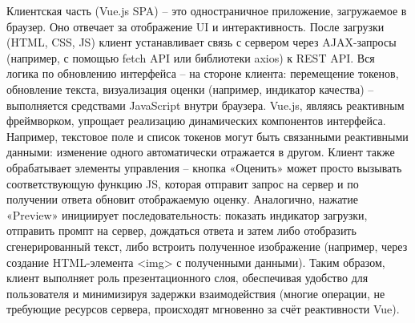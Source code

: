 Клиентская часть (Vue.js SPA) – это одностраничное приложение, загружаемое в браузер. Оно отвечает за отображение UI и интерактивность. После загрузки (HTML, CSS, JS) клиент устанавливает связь с сервером через AJAX-запросы (например, с помощью fetch API или библиотеки axios) к REST API. Вся логика по обновлению интерфейса – на стороне клиента: перемещение токенов, обновление текста, визуализация оценки (например, индикатор качества) – выполняется средствами JavaScript внутри браузера. Vue.js, являясь реактивным фреймворком, упрощает реализацию динамических компонентов интерфейса\cite{vuejs:wiki}. Например, текстовое поле и список токенов могут быть связанными реактивными данными: изменение одного автоматически отражается в другом. Клиент также обрабатывает элементы управления – кнопка «Оценить» может просто вызывать соответствующую функцию JS, которая отправит запрос на сервер и по получении ответа обновит отображаемую оценку. Аналогично, нажатие «Preview» инициирует последовательность: показать индикатор загрузки, отправить промпт на сервер, дождаться ответа и затем либо отобразить сгенерированный текст, либо встроить полученное изображение (например, через создание HTML-элемента <img> с полученными данными). Таким образом, клиент выполняет роль презентационного слоя, обеспечивая удобство для пользователя и минимизируя задержки взаимодействия (многие операции, не требующие ресурсов сервера, происходят мгновенно за счёт реактивности Vue).

